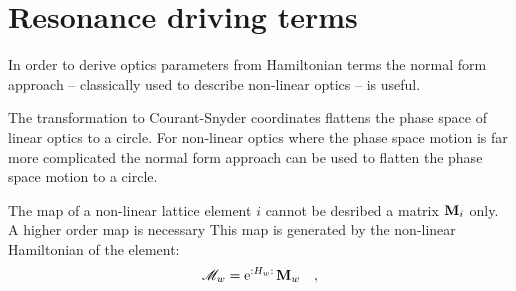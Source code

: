 \section{Resonance driving terms}

In order to derive optics parameters from Hamiltonian terms the normal form approach
\cite{Bartolini1997,Tomas2005} -- classically
used to describe non-linear optics -- is useful. 

The transformation to Courant-Snyder coordinates flattens the phase space of linear optics to a circle.
For non-linear optics where the phase space motion is far more complicated the normal form approach
can be used to flatten the phase space motion to a circle.

The map of a non-linear lattice element $i$ cannot be desribed a matrix $\mathbf{M}_i$ only.
A higher order map is necessary
This map is generated by the non-linear Hamiltonian of the element:
%
\begin{equation}
    \mathscr{M}_w = \text{e}^{{:}H_w{:}\,} \mathbf{M}_w
    \quad ,
\end{equation}
%
 
